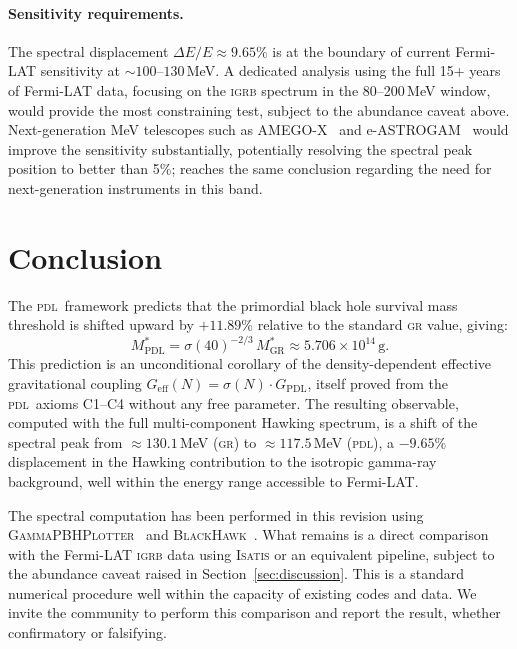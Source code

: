 \documentclass[12pt, a4paper]{article}
\theoremstyle{definition}
\newcommand{\PDL}{\textsc{pdl}}
\newcommand{\Geff}{G_{\mathrm{eff}}}
\newcommand{\GPDL}{G_{\mathrm{PDL}}}
\newcommand{\sigN}{\sigma(N)}
\newcommand{\MstarGR}{M^{*}_{\mathrm{GR}}}
\newcommand{\MstarPDL}{M^{*}_{\mathrm{PDL}}}
\begin{document}
\paragraph{Sensitivity requirements.}
The spectral displacement $\Delta E/E \approx 9.65\%$ is at the boundary of current Fermi-LAT sensitivity at $\sim100$--$130$\,MeV. A dedicated analysis using the full 15+ years of Fermi-LAT data, focusing on the \textsc{igrb} spectrum in the 80--200\,MeV window, would provide the most constraining test, subject to the abundance caveat above. Next-generation MeV telescopes such as AMEGO-X~\cite{AMEGO} and e-ASTROGAM~\cite{eASTROGAM} would improve the sensitivity substantially, potentially resolving the spectral peak position to better than 5\%; \cite{Cholis2026} reaches the same conclusion regarding the need for next-generation instruments in this band.

\section{Conclusion}

The \PDL\ framework predicts that the primordial black hole survival mass threshold is shifted upward by $+11.89\%$ relative to the standard \textsc{gr} value, giving:
\begin{equation}
  \MstarPDL = \sigma(40)^{-2/3}\,\MstarGR \approx 5.706 \times 10^{14}\,\mathrm{g}.
\end{equation}
This prediction is an unconditional corollary of the density-dependent effective gravitational coupling $\Geff(N) = \sigN\cdot\GPDL$, itself proved from the \PDL\ axioms C1--C4 without any free parameter. The resulting observable, computed with the full multi-component Hawking spectrum, is a shift of the spectral peak from $\approx130.1$\,MeV (\textsc{gr}) to $\approx117.5$\,MeV (\PDL), a $-9.65\%$ displacement in the Hawking contribution to the isotropic gamma-ray background, well within the energy range accessible to Fermi-LAT.

The spectral computation has been performed in this revision using \textsc{GammaPBHPlotter}~\cite{Carlini2025} and \textsc{BlackHawk}~\cite{BlackHawk}. What remains is a direct comparison with the Fermi-LAT \textsc{igrb} data using \textsc{Isatis} or an equivalent pipeline, subject to the abundance caveat raised in Section~\ref{sec:discussion}. This is a standard numerical procedure well within the capacity of existing codes and data. We invite the community to perform this comparison and report the result, whether confirmatory or falsifying.
\end{document}
